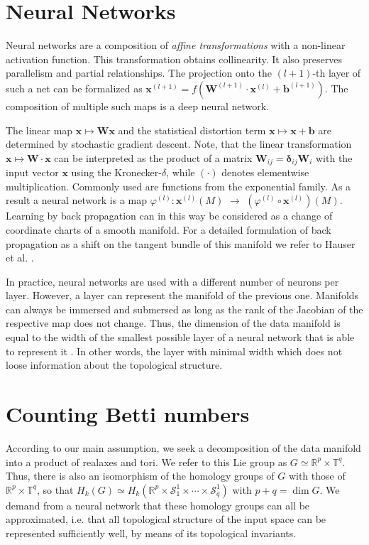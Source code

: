 \documentclass[runningheads,orivec]{llncs}
\begin{document}
\section{Neural Networks}
\label{sec:neuralnets}
Neural networks are a composition of \emph{affine transformations} with a non-linear activation function. This transformation obtains collinearity. It also preserves parallelism and partial relationships. The projection onto the $(l+1)$-th layer of such a net can be formalized as $\textbf{x}^{(l+1)} = f(\mathbf{W}^{(l+1)} \cdot \textbf{x}^{(l)}+\textbf{b}^{(l+1)}).$ The composition of multiple such maps is a deep neural network.

The linear map $\textbf{x} \mapsto \mathbf{W} \textbf{x}$ and the statistical distortion term $\textbf{x} \mapsto \textbf{x}+\textbf{b}$ are determined by stochastic gradient descent.  Note, that the linear transformation $\textbf{x} \mapsto \mathbf{W} \cdot \textbf{x}$ can be interpreted as the product of a matrix $\mathbf{W}_{ij} = \mathbf{\delta}_{ij}\mathbf{W}_i$ with the input vector $\textbf{x}$ using the Kronecker-$\delta$, while $(\cdot)$ denotes elementwise multiplication. Commonly used are functions from the exponential family. As a result a neural network is a map $\varphi^{(l)}:\textbf{x}^{(l)}(M)$ $\rightarrow$ $(\varphi^{(l)} \circ \textbf{x}^{(l)})(M)$. Learning by back propagation can in this way be considered as a change of coordinate charts of a smooth manifold. For a detailed formulation of back propagation as a shift on the tangent bundle of this manifold we refer to Hauser et al. \cite{HauserR17}.

In practice, neural networks are used with a different number of neurons per layer. However, a layer can represent the manifold of the previous one. Manifolds can always be immersed and submersed as long as the rank of the Jacobian of the respective map does not change. Thus, the dimension of the data manifold is equal to the width of the smallest possible layer of a neural network that is able to represent it \cite{HauserR17}. In other words, the layer with minimal width which does not loose information about the topological structure.

\section{Counting Betti numbers}
According to our main assumption, we seek a decomposition of the data manifold into a product of realaxes and tori. We refer to this Lie group as $G \simeq \mathbb{R}^p \times \mathbb{T}^q$. Thus, there is also an isomorphism of the homology groups of $G$ with those of $\mathbb{R}^p \times \mathbb{T}^q$, so that $H_k(G) \simeq H_k(\mathbb{R}^p \times \mathcal{S}^{1}_{1}\times\cdots\times\mathcal{S}^{1}_{q})$ with $p+q = \dim G$. We demand from a neural network that these homology groups can all be approximated, i.e. that all topological structure of the input space can be represented sufficiently well, by means of its topological invariants.
\end{document}

